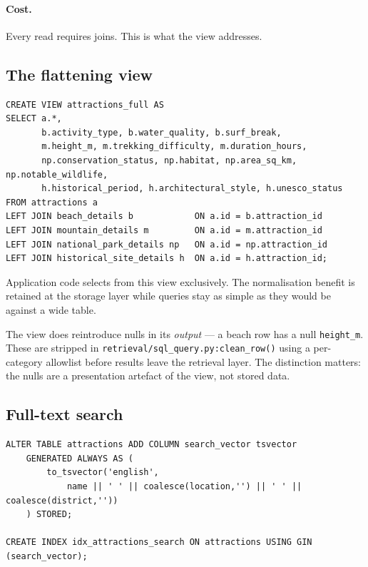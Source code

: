 \documentclass[11pt,a4paper]{article}
\begin{document}
\paragraph{Cost.} Every read requires joins. This is what the view addresses.

\subsection{The flattening view}

\begin{lstlisting}[language=sqlx,caption={\texttt{attractions\_full} reassembles
the subtypes so application code never writes the joins.}]
CREATE VIEW attractions_full AS
SELECT a.*,
       b.activity_type, b.water_quality, b.surf_break,
       m.height_m, m.trekking_difficulty, m.duration_hours,
       np.conservation_status, np.habitat, np.area_sq_km, np.notable_wildlife,
       h.historical_period, h.architectural_style, h.unesco_status
FROM attractions a
LEFT JOIN beach_details b            ON a.id = b.attraction_id
LEFT JOIN mountain_details m         ON a.id = m.attraction_id
LEFT JOIN national_park_details np   ON a.id = np.attraction_id
LEFT JOIN historical_site_details h  ON a.id = h.attraction_id;
\end{lstlisting}

Application code selects from this view exclusively. The normalisation benefit
is retained at the storage layer while queries stay as simple as they would be
against a wide table.

The view does reintroduce nulls in its \emph{output} --- a beach row has a null
\texttt{height\_m}. These are stripped in
\texttt{retrieval/sql\_query.py:clean\_row()} using a per-category allowlist
before results leave the retrieval layer. The distinction matters: the nulls are
a presentation artefact of the view, not stored data.

\subsection{Full-text search}

\begin{lstlisting}[language=sqlx,caption={Generated tsvector column with a GIN
index.}]
ALTER TABLE attractions ADD COLUMN search_vector tsvector
    GENERATED ALWAYS AS (
        to_tsvector('english',
            name || ' ' || coalesce(location,'') || ' ' || coalesce(district,''))
    ) STORED;

CREATE INDEX idx_attractions_search ON attractions USING GIN (search_vector);
\end{lstlisting}
\end{document}
